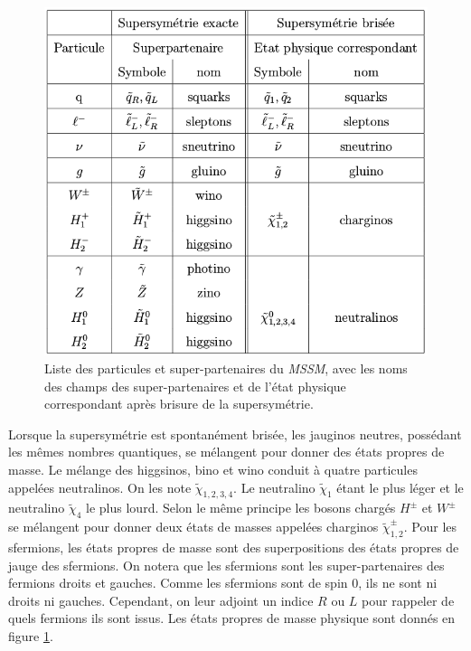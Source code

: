  \begin{figure}[!htb]
    \begin{center} 
      \includegraphics[scale=0.50]{./figures/tableau_SUSY.png}
      \caption{Liste des particules et super-partenaires du \textit{MSSM}, avec les noms des champs des super-partenaires et de l'\'etat physique correspondant apr\`es brisure de la supersymétrie.}
     \label{fig:etatsPropresMasse}
     \end{center}
  \end{figure} 
  
  \medskip
  
  Lorsque la supersym\'etrie est spontan\'ement bris\'ee, les jauginos neutres, poss\'edant les m\^emes nombres quantiques, se m\'elangent pour donner des \'etats propres de masse. Le m\'elange des higgsinos, bino et wino conduit \`a quatre particules appel\'ees neutralinos. On les note $\widetilde{\chi}_{1,2,3,4}$. Le neutralino $\widetilde{\chi}_{1}$ \'etant le plus l\'eger et le neutralino $\widetilde{\chi}_{4}$ le plus lourd. Selon le m\^eme principe les bosons charg\'es $H^{\pm}$ et $W^{\pm}$ se m\'elangent pour donner deux \'etats de masses appel\'ees charginos $\widetilde{\chi}^{\pm}_{1,2}$. Pour les sfermions, les \'etats propres de masse sont des superpositions des \'etats propres de jauge des sfermions. On notera que les sfermions sont les super-partenaires des fermions droits et gauches. Comme les sfermions sont de spin 0, ils ne sont ni droits ni gauches. Cependant, on leur adjoint un indice $R$ ou $L$ pour rappeler de quels fermions ils sont issus. Les \'etats propres de masse physique sont donn\'es en figure \ref{fig:etatsPropresMasse}.
  
